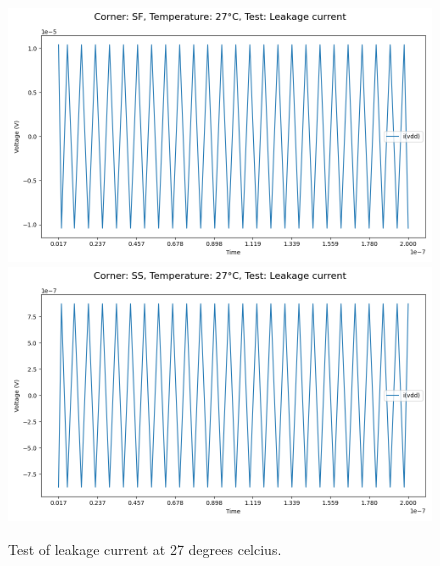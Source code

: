 \begin{figure}[H]
    \vspace{5pt}
    \includegraphics[height= 0.21\textheight]{figures/aimspice/SF/27/I.csv.png}
    \vspace{5pt}
    \includegraphics[height= 0.21\textheight]{figures/aimspice/SS/27/I.csv.png}
    \caption{Test of leakage current at 27 degrees celcius.}
    \label{fig:aimspice_I_27}
\end{figure}

\pagebreak

